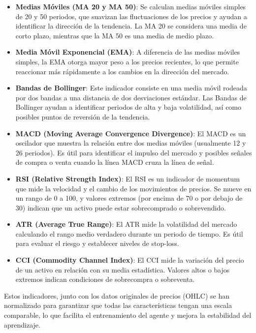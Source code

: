 \documentclass[a4paper,12pt]{report}
\begin{document}
\begin{itemize}
    \item \textbf{Medias Móviles (MA 20 y MA 50)}: Se calculan medias móviles simples de 20 y 50 periodos, que suavizan las fluctuaciones de los precios y ayudan a identificar la dirección de la tendencia. La MA 20 se considera una media de corto plazo, mientras que la MA 50 es una media de medio plazo.
    
    \item \textbf{Media Móvil Exponencial (EMA)}: A diferencia de las medias móviles simples, la EMA otorga mayor peso a los precios recientes, lo que permite reaccionar más rápidamente a los cambios en la dirección del mercado.

    \item \textbf{Bandas de Bollinger}: Este indicador consiste en una media móvil rodeada por dos bandas a una distancia de dos desviaciones estándar. Las Bandas de Bollinger ayudan a identificar periodos de alta y baja volatilidad, así como posibles puntos de reversión de la tendencia.

    \item \textbf{MACD (Moving Average Convergence Divergence)}: El MACD es un oscilador que muestra la relación entre dos medias móviles (usualmente 12 y 26 periodos). Es útil para identificar el impulso del mercado y posibles señales de compra o venta cuando la línea MACD cruza la línea de señal.

    \item \textbf{RSI (Relative Strength Index)}: El RSI es un indicador de momentum que mide la velocidad y el cambio de los movimientos de precios. Se mueve en un rango de 0 a 100, y valores extremos (por encima de 70 o por debajo de 30) indican que un activo puede estar sobrecomprado o sobrevendido.

    \item \textbf{ATR (Average True Range)}: El ATR mide la volatilidad del mercado calculando el rango medio verdadero durante un periodo de tiempo. Es útil para evaluar el riesgo y establecer niveles de stop-loss.

    \item \textbf{CCI (Commodity Channel Index)}: El CCI mide la variación del precio de un activo en relación con su media estadística. Valores altos o bajos extremos indican condiciones de sobrecompra o sobreventa.
\end{itemize}

Estos indicadores, junto con los datos originales de precios (OHLC) se han normalizado para 
garantizar que todas las características tengan una escala comparable, lo que facilita el 
entrenamiento del agente y mejora la estabilidad del aprendizaje.
\end{document}
